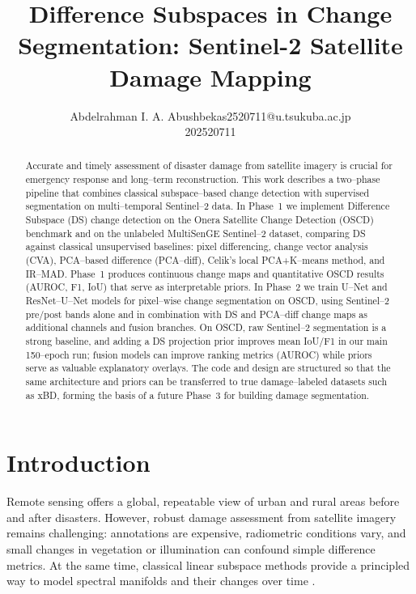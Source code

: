 \documentclass[twoside,11pt]{article}
\makeatletter
\newcommand\studentName{Abdelrahman I. A. Abushbeka}                  %
\newcommand\studentEmail{s2520711@u.tsukuba.ac.jp}          %
\newcommand\studentNumber{202520711}                %
\makeatother
\begin{document}
    
    \title{Difference Subspaces in Change Segmentation: Sentinel-2 Satellite Damage Mapping}
    
    \author{\name \studentName \email \studentEmail \\
    \studentNumber
    \addr
    }
    
    \maketitle

\begin{abstract}
\noindent
Accurate and timely assessment of disaster damage from satellite imagery is
crucial for emergency response and long--term reconstruction. This work
describes a two--phase pipeline that combines classical subspace--based change
detection with supervised segmentation on multi--temporal Sentinel--2 data. In
Phase~1 we implement Difference Subspace (DS) change detection on the Onera
Satellite Change Detection (OSCD) benchmark and on the unlabeled MultiSenGE
Sentinel--2 dataset, comparing DS against classical unsupervised baselines:
pixel differencing, change vector analysis (CVA), PCA--based difference
(PCA--diff), Celik's local PCA+K--means method, and IR--MAD. Phase~1 produces
continuous change maps and quantitative OSCD results (AUROC, F1, IoU) that
serve as interpretable priors. In Phase~2 we train U--Net and ResNet--U--Net
models for pixel--wise change segmentation on OSCD, using Sentinel--2 pre/post
bands alone and in combination with DS and PCA--diff change maps as additional
channels and fusion branches. On OSCD, raw Sentinel--2 segmentation is a
strong baseline, and adding a DS projection prior improves mean IoU/F1 in our
main 150--epoch run; fusion models can improve ranking metrics (AUROC) while
priors serve as valuable explanatory overlays. The code and design are structured so that the
same architecture and priors can be transferred to true damage--labeled
datasets such as xBD, forming the basis of a future Phase~3 for building damage
segmentation.
\end{abstract}

\section{Introduction}

Remote sensing offers a global, repeatable view of urban and rural areas before
and after disasters. However, robust damage assessment from satellite imagery
remains challenging: annotations are expensive, radiometric conditions vary,
and small changes in vegetation or illumination can confound simple difference
metrics. At the same time, classical linear subspace methods provide a
principled way to model spectral manifolds and their changes over time
\cite{FukuiMaki2015,FukuiSubspace}.
\end{document}
